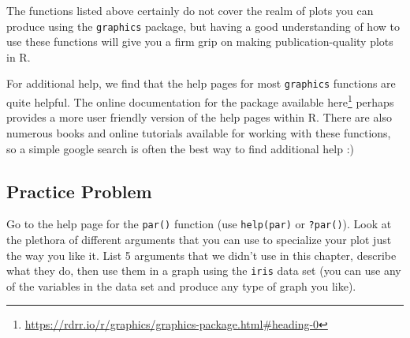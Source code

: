 \documentclass[]{krantz}
\renewcommand{\href}[2]{#2\footnote{\url{#1}}}
\begin{document}
The functions listed above certainly do not cover the realm of plots you
can produce using the \texttt{graphics} package, but having a good
understanding of how to use these functions will give you a firm grip on
making publication-quality plots in R.

For additional help, we find that the help pages for most
\texttt{graphics} functions are quite helpful. The online documentation
for the package available
\href{https://rdrr.io/r/graphics/graphics-package.html\#heading-0}{here}
perhaps provides a more user friendly version of the help pages within
R. There are also numerous books and online tutorials available for
working with these functions, so a simple google search is often the
best way to find additional help :)

\subsection{Practice Problem}\label{practice-problem-16}

Go to the help page for the \texttt{par()} function (use
\texttt{help(par)} or \texttt{?par()}). Look at the plethora of
different arguments that you can use to specialize your plot just the
way you like it. List 5 arguments that we didn't use in this chapter,
describe what they do, then use them in a graph using the \texttt{iris}
data set (you can use any of the variables in the data set and produce
any type of graph you like).



\backmatter
\printindex
\end{document}
